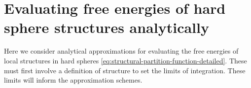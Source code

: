 \documentclass[11pt,twoside]{report}
\begin{document}
\chapter{Evaluating free energies of hard sphere structures analytically}
\label{appendix:bayesian}

Here we consider analytical approximations for evaluating the free energies of local structures in hard spheres \eqref{eq:structural-partition-function-detailed}.
These must first involve a definition of structure to set the limits of integration.
These limits will inform the approximation schemes.



\end{document}
